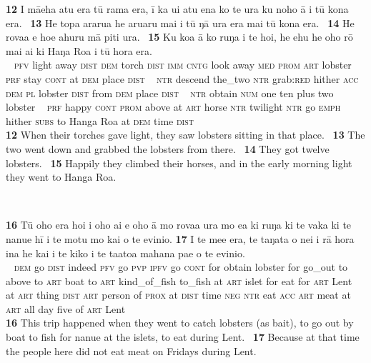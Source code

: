 {\bigskip\gll
\textbf{\textup{12}} I mā{\ꞌ}eha atu era tū rama era, {\ꞌ}ī ka u{\ꞌ}i atu ena ko te {\ꞌ}ura ku noho {\ꞌ}ā {\ꞌ}i tū kona era. ~\textbf{\textup{13}} He topa ararua he {\ꞌ}aru{\ꞌ}aru mai i tū ŋā {\ꞌ}ura era mai tū kona era. ~\textbf{\textup{14}} He rova{\ꞌ}a e ho{\ꞌ}e {\ꞌ}ahuru mā piti {\ꞌ}ura. ~\textbf{\textup{15}} Ku koa {\ꞌ}ā ko ruŋa i te hoi, he {\ꞌ}ehu he oho rō mai {\ꞌ}ai ki Haŋa Roa {\ꞌ}i tū hora era.\\
~ \textsc{pfv} light away \textsc{dist} \textsc{dem} torch \textsc{dist} \textsc{imm} \textsc{cntg} look away \textsc{med} \textsc{prom} \textsc{art} lobster \textsc{prf} stay \textsc{cont} at \textsc{dem} place \textsc{dist} ~ \textsc{ntr} descend the\_two \textsc{ntr} grab:\textsc{red} hither \textsc{acc} \textsc{dem} \textsc{pl} lobster \textsc{dist} from \textsc{dem} place \textsc{dist} ~ \textsc{ntr} obtain \textsc{num} one ten plus two lobster ~ \textsc{prf} happy \textsc{cont} \textsc{prom} above at \textsc{art} horse \textsc{ntr} twilight \textsc{ntr} go \textsc{emph} hither \textsc{subs} to Hanga Roa at \textsc{dem} time \textsc{dist}\\

\medskip\glt
\textbf{\textup{12}} When their torches gave light, they saw lobsters sitting in that place. ~\textbf{\textup{13}} The two went down and grabbed the lobsters from there. ~\textbf{\textup{14}} They got twelve lobsters. ~\textbf{\textup{15}} Happily they climbed their horses, and in the early morning light they went to Hanga Roa.


~

\bigskip\gll
\textbf{\textup{16}} Tū oho era ho{\ꞌ}i i oho ai e oho {\ꞌ}ā mo rova{\ꞌ}a {\ꞌ}ura mo e{\ꞌ}a ki ruŋa ki te vaka ki te nanue hī {\ꞌ}i te motu mo kai o te evinio. \textbf{\textup{17}} {\ꞌ}I te me{\ꞌ}e era, te taŋata o nei {\ꞌ}i rā hora {\ꞌ}ina he kai i te kiko {\ꞌ}i te ta{\ꞌ}ato{\ꞌ}a mahana pae o te evinio.\\
~ \textsc{dem} go \textsc{dist} indeed \textsc{pfv} go \textsc{pvp} \textsc{ipfv} go \textsc{cont} for obtain lobster for go\_out to above to \textsc{art} boat to \textsc{art} kind\_of\_fish to\_fish at \textsc{art} islet for eat for \textsc{art} Lent  ~ at \textsc{art} thing \textsc{dist} \textsc{art} person of \textsc{prox} at \textsc{dist} time \textsc{neg} \textsc{ntr} eat \textsc{acc} \textsc{art} meat at \textsc{art} all day five of \textsc{art} Lent\\

\medskip\glt
\textbf{\textup{16}} This trip happened when they went to catch lobsters (as bait), to go out by boat to fish for nanue at the islets, to eat during Lent. ~\textbf{\textup{17}} Because at that time the people here did not eat meat on Fridays during Lent.
}
